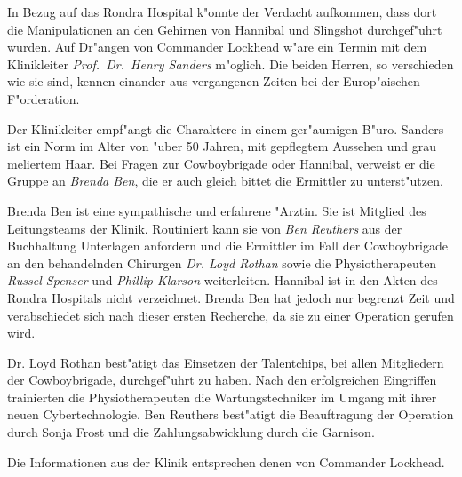 
In Bezug auf das Rondra Hospital k"onnte der Verdacht aufkommen, dass dort die Manipulationen an den Gehirnen von Hannibal und Slingshot durchgef"uhrt wurden. Auf Dr"angen von Commander Lockhead w"are ein Termin mit dem Klinikleiter \emph{Prof.~Dr.~Henry Sanders} m"oglich. Die beiden Herren, so verschieden wie sie sind, kennen einander aus vergangenen Zeiten bei der Europ"aischen F"orderation.

Der Klinikleiter empf"angt die Charaktere in einem ger"aumigen B"uro. Sanders ist ein Norm im Alter von "uber 50 Jahren, mit gepflegtem Aussehen und grau meliertem Haar. Bei Fragen zur Cowboybrigade oder Hannibal, verweist er die Gruppe an \emph{Brenda Ben}, die er auch gleich bittet die Ermittler zu unterst"utzen. 

Brenda Ben ist eine sympathische und erfahrene "Arztin. Sie ist Mitglied des Leitungsteams der Klinik. Routiniert kann sie von 
\emph{Ben Reuthers} aus der Buchhaltung Unterlagen anfordern und die Ermittler im Fall der Cowboybrigade an den behandelnden Chirurgen \emph{Dr. Loyd Rothan} sowie die Physiotherapeuten \emph{Russel Spenser} und \emph{Phillip Klarson} weiterleiten. Hannibal ist in den Akten des Rondra Hospitals nicht verzeichnet. Brenda Ben hat jedoch nur begrenzt Zeit und verabschiedet sich nach dieser ersten Recherche, da sie zu einer Operation gerufen wird.

Dr. Loyd Rothan best"atigt das Einsetzen der Talentchips, bei allen Mitgliedern der Cowboybrigade, durchgef"uhrt zu haben. Nach den erfolgreichen Eingriffen trainierten die Physiotherapeuten die Wartungstechniker im Umgang mit ihrer neuen Cybertechnologie. Ben Reuthers best"atigt die Beauftragung der Operation durch Sonja Frost und die Zahlungsabwicklung durch die Garnison.

Die Informationen aus der Klinik entsprechen denen von Commander Lockhead.

